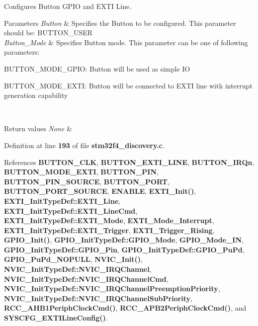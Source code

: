Configures Button G\+P\+IO and E\+X\+TI Line. 


\begin{DoxyParams}{Parameters}
{\em Button} & Specifies the Button to be configured. This parameter should be\+: B\+U\+T\+T\+O\+N\+\_\+\+U\+S\+ER \\
\hline
{\em Button\+\_\+\+Mode} & Specifies Button mode. This parameter can be one of following parameters\+: \begin{DoxyItemize}
\item B\+U\+T\+T\+O\+N\+\_\+\+M\+O\+D\+E\+\_\+\+G\+P\+IO\+: Button will be used as simple IO \item B\+U\+T\+T\+O\+N\+\_\+\+M\+O\+D\+E\+\_\+\+E\+X\+TI\+: Button will be connected to E\+X\+TI line with interrupt generation capability \end{DoxyItemize}
\\
\hline
\end{DoxyParams}

\begin{DoxyRetVals}{Return values}
{\em None} & \\
\hline
\end{DoxyRetVals}


Definition at line \textbf{ 193} of file \textbf{ stm32f4\+\_\+discovery.\+c}.



References \textbf{ B\+U\+T\+T\+O\+N\+\_\+\+C\+LK}, \textbf{ B\+U\+T\+T\+O\+N\+\_\+\+E\+X\+T\+I\+\_\+\+L\+I\+NE}, \textbf{ B\+U\+T\+T\+O\+N\+\_\+\+I\+R\+Qn}, \textbf{ B\+U\+T\+T\+O\+N\+\_\+\+M\+O\+D\+E\+\_\+\+E\+X\+TI}, \textbf{ B\+U\+T\+T\+O\+N\+\_\+\+P\+IN}, \textbf{ B\+U\+T\+T\+O\+N\+\_\+\+P\+I\+N\+\_\+\+S\+O\+U\+R\+CE}, \textbf{ B\+U\+T\+T\+O\+N\+\_\+\+P\+O\+RT}, \textbf{ B\+U\+T\+T\+O\+N\+\_\+\+P\+O\+R\+T\+\_\+\+S\+O\+U\+R\+CE}, \textbf{ E\+N\+A\+B\+LE}, \textbf{ E\+X\+T\+I\+\_\+\+Init()}, \textbf{ E\+X\+T\+I\+\_\+\+Init\+Type\+Def\+::\+E\+X\+T\+I\+\_\+\+Line}, \textbf{ E\+X\+T\+I\+\_\+\+Init\+Type\+Def\+::\+E\+X\+T\+I\+\_\+\+Line\+Cmd}, \textbf{ E\+X\+T\+I\+\_\+\+Init\+Type\+Def\+::\+E\+X\+T\+I\+\_\+\+Mode}, \textbf{ E\+X\+T\+I\+\_\+\+Mode\+\_\+\+Interrupt}, \textbf{ E\+X\+T\+I\+\_\+\+Init\+Type\+Def\+::\+E\+X\+T\+I\+\_\+\+Trigger}, \textbf{ E\+X\+T\+I\+\_\+\+Trigger\+\_\+\+Rising}, \textbf{ G\+P\+I\+O\+\_\+\+Init()}, \textbf{ G\+P\+I\+O\+\_\+\+Init\+Type\+Def\+::\+G\+P\+I\+O\+\_\+\+Mode}, \textbf{ G\+P\+I\+O\+\_\+\+Mode\+\_\+\+IN}, \textbf{ G\+P\+I\+O\+\_\+\+Init\+Type\+Def\+::\+G\+P\+I\+O\+\_\+\+Pin}, \textbf{ G\+P\+I\+O\+\_\+\+Init\+Type\+Def\+::\+G\+P\+I\+O\+\_\+\+Pu\+Pd}, \textbf{ G\+P\+I\+O\+\_\+\+Pu\+Pd\+\_\+\+N\+O\+P\+U\+LL}, \textbf{ N\+V\+I\+C\+\_\+\+Init()}, \textbf{ N\+V\+I\+C\+\_\+\+Init\+Type\+Def\+::\+N\+V\+I\+C\+\_\+\+I\+R\+Q\+Channel}, \textbf{ N\+V\+I\+C\+\_\+\+Init\+Type\+Def\+::\+N\+V\+I\+C\+\_\+\+I\+R\+Q\+Channel\+Cmd}, \textbf{ N\+V\+I\+C\+\_\+\+Init\+Type\+Def\+::\+N\+V\+I\+C\+\_\+\+I\+R\+Q\+Channel\+Preemption\+Priority}, \textbf{ N\+V\+I\+C\+\_\+\+Init\+Type\+Def\+::\+N\+V\+I\+C\+\_\+\+I\+R\+Q\+Channel\+Sub\+Priority}, \textbf{ R\+C\+C\+\_\+\+A\+H\+B1\+Periph\+Clock\+Cmd()}, \textbf{ R\+C\+C\+\_\+\+A\+P\+B2\+Periph\+Clock\+Cmd()}, and \textbf{ S\+Y\+S\+C\+F\+G\+\_\+\+E\+X\+T\+I\+Line\+Config()}.


